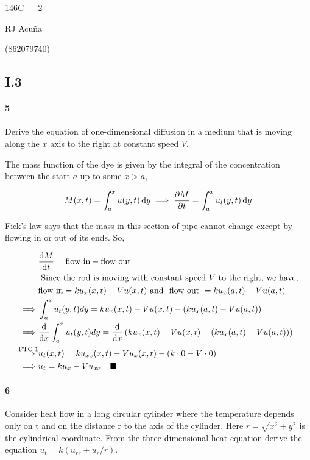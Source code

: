 \documentclass{article}
\begin{document}
\begin{center}
  146C --- 2

  RJ Acuña

  (862079740)
\end{center}\vspace{1.618em}
\subsection*{I.3}
\paragraph{5} Derive the equation of one-dimensional diffusion in a medium that is
moving along the $x$ axis to the right at constant speed $V$.


The mass function of the dye is given by the integral of the concentration
between the start $a$ up to some $x > a$,

\[M(x,t) = \int_a^x u(y,t) \dd{y} \implies \pdv{M}{t}(x,t) = \int_a^x u_t(y,t) \dd{y}\]

Fick's law says that the mass in this section of pipe cannot change except by flowing in or
out of its ends. So,

\begin{align*}
  &\dv{M}{t} = \text{flow in} -\text{flow out}\\
  &\text{ Since the rod is moving with constant speed } V \text{ to
    the right, we have,}\\
  &\text{flow in} = ku_x(x,t) -Vu(x,t)\text{ and }\text{ flow out }=
    ku_x(a,t) -Vu(a,t)\\
  \implies & \int_a^x u_t(y,t) dy =  ku_x(x,t) -Vu(x,t) -(ku_x(a,t)
             -Vu(a,t))\\
  \implies & \dv{x}\int_a^x u_t(y,t) dy = \dv{x}\left(   ku_x(x,t) -Vu(x,t) -(ku_x(a,t)
             -Vu(a,t))\right)\\
  \overset{\text{FTC 1}}{\implies}
  & u_t(x,t)  = ku_{xx}(x,t) -Vu_{x}(x,t) -(k\cdot0         -V\cdot0)\\
  \implies & u_t = ku_x -Vu_{xx} \quad \blacksquare
\end{align*}
\paragraph{6} Consider heat flow in a long circular cylinder where the temperature
depends
 only on t and on the distance r to the axis of the cylinder. Here
$r =\sqrt{x^2 + y^2}$ is the cylindrical coordinate. From the three-dimensional
heat equation derive the equation $u_t = k(u_{rr} + u_r/r)$.
\end{document}
